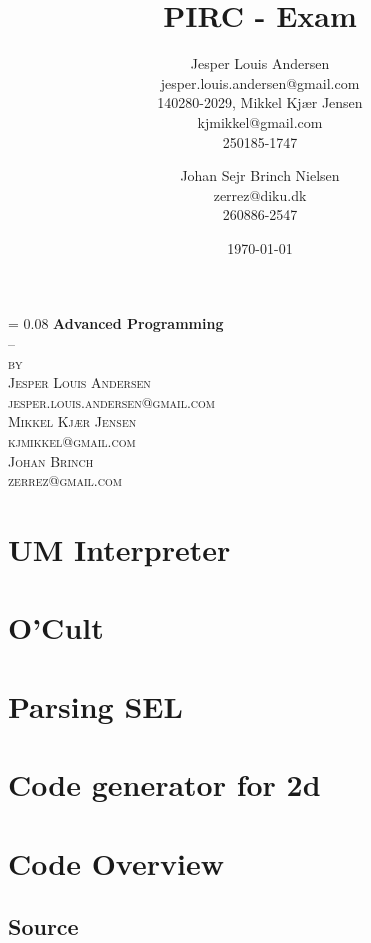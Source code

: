 \documentclass[a4paper, oneside, 10pt, final]{memoir}
\author{Jesper Louis
  Andersen\\jesper.louis.andersen@gmail.com\\140280-2029,
  Mikkel Kj\ae r Jensen \\ kjmikkel@gmail.com\\250185-1747 \and
  Johan Sejr Brinch Nielsen \\ zerrez@diku.dk \\ 260886-2547
}
\title{PIRC - Exam}
\date{\today}
\makeatletter
\renewcommand*{\titleM}{\begingroup%
  \drop = 0.08\textheight
  \centering
  {\Huge\bfseries Advanced Programming}\\[\baselineskip]
  {\scshape --}\\[\baselineskip]
  {\scshape by}\\[\baselineskip]
  {\large\scshape Jesper Louis Andersen\\jesper.louis.andersen@gmail.com}\\[\baselineskip]
  {\large\scshape Mikkel Kj\ae r Jensen\\kjmikkel@gmail.com}\\[\baselineskip]
  {\large\scshape Johan Brinch\\zerrez@gmail.com}\\[\baselineskip]
  \endgroup}
\makeatother
\begin{document}
\titleM
\listoffixmes
\tableofcontents

\chapter{UM Interpreter}
\label{chap:task+1}

\chapter{O'Cult}
\label{chap:ocult}

\chapter{Parsing SEL}


\chapter{Code generator for 2d}
\label{compiler}








\appendix
\clearpage
\chapter{Code Overview}

\section{Source}
\end{document}
